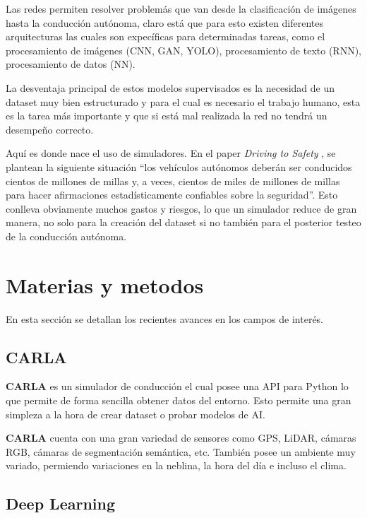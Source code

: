 \documentclass[]{IEEEtran}
\begin{document}
    Las redes permiten resolver problemás que van desde la clasificación de imágenes hasta la conducción autónoma, claro está 
    que para esto existen diferentes arquitecturas las cuales son expecíficas para determinadas tareas, como el procesamiento de imágenes (CNN, GAN, YOLO), 
    procesamiento de texto (RNN), procesamiento de datos (NN).

    La desventaja principal de estos modelos supervisados es la necesidad de un dataset muy bien estructurado y para el cual es necesario 
    el trabajo humano, esta es la tarea más importante y que si está mal realizada la red no tendrá un desempeño correcto.

    Aquí es donde nace el uso de simuladores. En el paper \textit{Driving to Safety} \cite{Driving-to-safety}, se 
    plantean la siguiente situación ``los vehículos autónomos deberán ser conducidos cientos de millones de millas y, a veces, cientos de miles de millones de millas
    para hacer afirmaciones estadísticamente confiables sobre la seguridad''. Esto conlleva obviamente muchos gastos y riesgos, lo que un simulador reduce de gran 
    manera, no solo para la creación del dataset si no también para el posterior testeo de la conducción autónoma. 



    \section{Materias y metodos}

    En esta sección se detallan los recientes avances en los campos de interés.


    \subsection{\textbf{CARLA}}

    \textbf{CARLA} \cite{CARLA-Simulator} es un simulador de conducción el cual posee una API para Python lo que 
    permite de forma sencilla obtener datos del entorno. Esto permite una gran simpleza 
    a la hora de crear dataset o probar modelos de AI.
    
    \textbf{CARLA} cuenta con una gran variedad de sensores como GPS, LiDAR, cámaras RGB, cámaras de segmentación semántica, etc.
    También posee un ambiente muy variado, permiendo variaciones en la neblina, la hora del día e incluso el clima.

    \subsection{Deep Learning}
\end{document}
